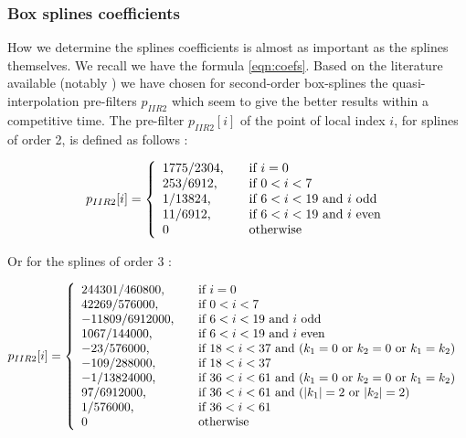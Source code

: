 \documentclass[11pt,a4paper]{amsart}
\begin{document}
\subsubsection{Box splines coefficients}

How we determine the splines coefficients is almost as important as the splines themselves. We recall we have the formula \eqref{eqn:coefs}. Based on the literature available (notably \cite{Condat2007}) we have chosen for second-order box-splines the quasi-interpolation pre-filters $p_{IIR2}$ which seem to give the better results within a competitive time. The pre-filter $p_{IIR2}[i]$ of the point of local index $i$, for splines of order 2, is defined as follows : 


\begin{equation}
\label{eqn:filter}
p_{IIR2} [i] = \left\{
  \begin{array}{l l}
    1775/2304\text{,} & \quad \text{if } i = 0\\
    253/6912\text{,} & \quad \text{if } 0<i<7\\
    1/13824\text{,} & \quad \text{if } 6<i<19 \text{ and $i$ odd}\\
    11/6912\text{,} & \quad \text{if } 6<i<19 \text{ and $i$ even}\\
    0 & \quad \text{otherwise}
  \end{array} \right.
\end{equation}

Or for the splines of order 3 :

\begin{equation}
\label{eqn:filter}
p_{IIR2} [i] = \left\{
  \begin{array}{l l}
    244301/460800\text{,} & \quad \text{if } i = 0\\
    42269/576000\text{,} & \quad \text{if } 0<i<7\\
    -11809/6912000\text{,} & \quad \text{if } 6<i<19 \text{ and $i$ odd}\\
    1067/144000\text{,} & \quad \text{if } 6<i<19 \text{ and $i$ even}\\
    -23/576000\text{,} & \quad \text{if } 18<i<37 \text{ and ($k_1 = 0$ or $k_2 = 0$ or $k_1 = k_2$) }\\
    -109/288000\text{,} & \quad \text{if } 18<i<37 \\
    	-1/13824000\text{,} & \quad \text{if } 36<i<61 \text{ and ($k_1 = 0$ or $k_2 = 0$ or $k_1 = k_2$) }\\
    	97/6912000\text{,} & \quad \text{if } 36<i<61 \text{ and ($|k_1| = 2$ or $|k_2| = 2$) }\\
    	1/576000\text{,} & \quad \text{if } 36<i<61\\    		
    0 & \quad \text{otherwise}
  \end{array} \right.
\end{equation}
\end{document}
